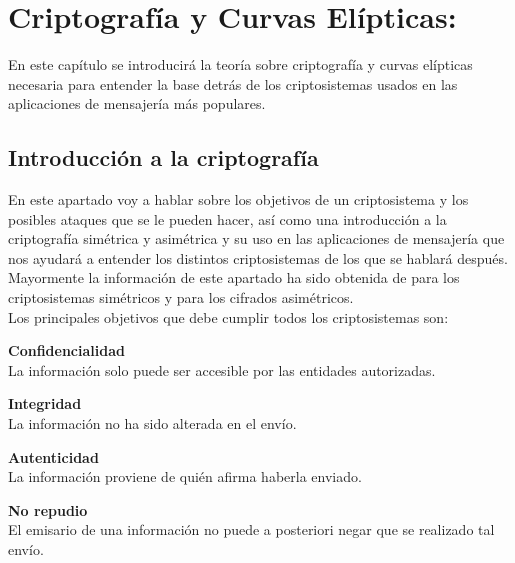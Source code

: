 \chapter{Criptografía y Curvas Elípticas:}

En este capítulo se introducirá la teoría sobre criptografía y curvas elípticas necesaria para entender la base detrás de los criptosistemas usados en las aplicaciones de mensajería más populares.

\section{Introducción a la criptografía}
En este apartado voy a hablar sobre los objetivos de un criptosistema y los posibles ataques que se le pueden hacer, así como una introducción a la criptografía simétrica y asimétrica y su uso en las aplicaciones de mensajería que nos ayudará a entender los distintos criptosistemas de los que se hablará después.
Mayormente la información de este apartado ha sido obtenida de \cite{apuntesCriptografia} para los criptosistemas simétricos y \cite{angelRiosMateos} para los cifrados asimétricos.\\
Los principales objetivos que debe cumplir todos los criptosistemas son:
\begin{description}
	\item \textbf{Confidencialidad}\\ 
		La información solo puede ser accesible por las entidades autorizadas. 
	\item \textbf{Integridad}\\ 
		La información no ha sido alterada en el envío.
	\item \textbf{Autenticidad}\\ 
		La información proviene de quién afirma haberla enviado.
	\item \textbf{No repudio}\\ 
		El emisario de una información no puede a posteriori negar que se realizado tal envío.
\end{description}


